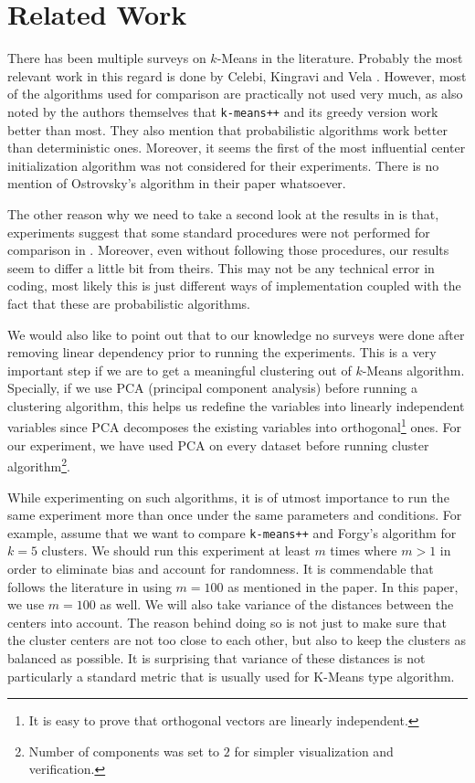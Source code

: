 \documentclass[10pt, leqno]{article}
\begin{document}
	\section{Related Work}
	There has been multiple surveys on $k$-Means in the literature. Probably the most relevant work in this regard is done by Celebi, Kingravi and Vela \cite{celebi}. However, most of the algorithms used for comparison are practically not used very much, as also noted by the authors themselves that \texttt{k-means++} and its greedy version work better than most. They also mention that probabilistic algorithms work better than deterministic ones. Moreover, it seems the first of the most influential center initialization algorithm \cite{ostrovsky} was not considered for their experiments. There is no mention of Ostrovsky's algorithm in their paper whatsoever.
	
	The other reason why we need to take a second look at the results in \cite{kmeans++} is that, experiments suggest that some standard procedures were not performed for comparison in \cite{kmeans++}. Moreover, even without following those procedures, our results seem to differ a little bit from theirs. This may not be any technical error in coding, most likely this is just different ways of implementation coupled with the fact that these are probabilistic algorithms.
	
	We would also like to point out that to our knowledge no surveys were done after removing linear dependency prior to running the experiments. This is a very important step if we are to get a meaningful clustering out of $k$-Means algorithm. Specially, if we use PCA (principal component analysis) before running a clustering algorithm, this helps us redefine the variables into linearly independent variables since PCA decomposes the existing variables into orthogonal\footnote{It is easy to prove that orthogonal vectors are linearly independent.} ones. For our experiment, we have used PCA on every dataset before running cluster algorithm\footnote{Number of components was set to $2$ for simpler visualization and verification.}.
	
	While experimenting on such algorithms, it is of utmost importance to run the same experiment more than once under the same parameters and conditions. For example, assume that we want to compare \texttt{k-means++} and Forgy's algorithm \cite{forgy} for $k=5$ clusters. We should run this experiment at least $m$ times where $m>1$ in order to eliminate bias and account for randomness. It is commendable that \cite{celebi} follows the literature in using $m=100$ as mentioned in the paper. In this paper, we use $m=100$ as well. We will also take variance of the distances between the centers into account. The reason behind doing so is not just to make sure that the cluster centers are not too close to each other, but also to keep the clusters as balanced as possible. It is surprising that variance of these distances is not particularly a standard metric that is usually used for K-Means type algorithm. 
	
\end{document}
